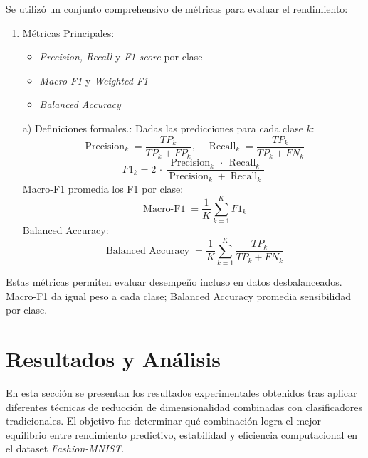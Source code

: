 \documentclass[conference]{IEEEtran}
\begin{document}
Se utilizó un conjunto comprehensivo de métricas para evaluar el rendimiento:
\begin{enumerate}
    \item Métricas Principales:
    \begin{itemize}
        \item \textit{Precision, Recall} y \textit{F1-score} por clase
        \item \textit{Macro-F1} y \textit{Weighted-F1}
        \item \textit{Balanced Accuracy}
    \end{itemize}
    a) Definiciones formales.: Dadas las predicciones para cada clase $k$:
    \begin{equation}
    \operatorname{Precision}_k = \frac{TP_k}{TP_k + FP_k}, \quad \operatorname{Recall}_k = \frac{TP_k}{TP_k + FN_k}
    \label{eq:precision_recall}
    \end{equation}
    \begin{equation}
    F1_k = 2 \, \cdot \, \frac{\operatorname{Precision}_k \, \cdot \, \operatorname{Recall}_k}{\operatorname{Precision}_k + \operatorname{Recall}_k}
    \label{eq:f1}
    \end{equation}
    Macro-F1 promedia los F1 por clase:
    \begin{equation}
    \operatorname{Macro\mbox{-}F1} = \frac{1}{K} \sum_{k=1}^K F1_k
    \label{eq:macro_f1}
    \end{equation}
    Balanced Accuracy:
    \begin{equation}
    \operatorname{Balanced\ Accuracy} = \frac{1}{K} \sum_{k=1}^K \frac{TP_k}{TP_k + FN_k}
    \label{eq:balanced_accuracy}
    \end{equation}
\end{enumerate}

Estas métricas permiten evaluar desempeño incluso en datos desbalanceados. Macro-F1 da igual peso a cada clase; Balanced Accuracy promedia sensibilidad por clase.


\section{Resultados y Análisis}

En esta sección se presentan los resultados experimentales obtenidos tras aplicar diferentes técnicas de reducción de dimensionalidad combinadas con clasificadores tradicionales.  
El objetivo fue determinar qué combinación logra el mejor equilibrio entre rendimiento predictivo, estabilidad y eficiencia computacional en el dataset \textit{Fashion-MNIST}.
\end{document}
